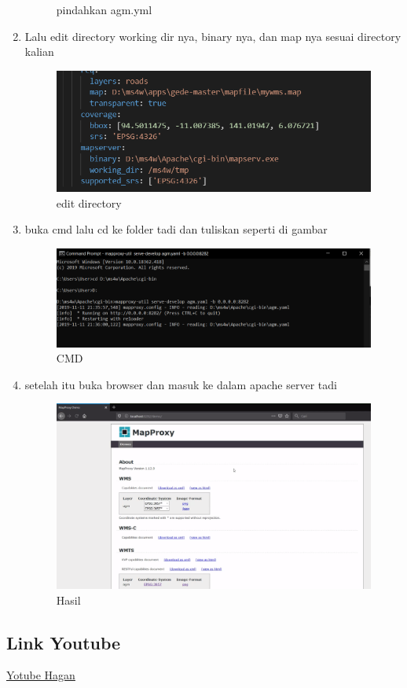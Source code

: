 \begin{enumerate}
\begin{figure}[H]
		\centering
		\caption{pindahkan agm.yml}
	\end{figure}
    \item Lalu edit directory working dir nya, binary nya, dan map nya sesuai directory kalian
    \hfill\break
    \begin{figure}[H]
		\includegraphics[width=12cm]{figures/1174040/Python3/9.PNG}
		\centering
		\caption{edit directory}
	\end{figure}
    \item buka cmd lalu cd ke folder tadi dan tuliskan seperti di gambar
    \hfill\break
    \begin{figure}[H]
		\includegraphics[width=12cm]{figures/1174040/Python3/10.PNG}
		\centering
		\caption{CMD}
	\end{figure}
    \item setelah itu buka browser dan masuk ke dalam apache server tadi
    \hfill\break
    \begin{figure}[H]
		\includegraphics[width=12cm]{figures/1174040/Python3/browser.PNG}
		\centering
		\caption{Hasil}
	\end{figure}
\end{enumerate}    
\subsection{Link Youtube}
\href{https://www.youtube.com/watch?v=8aFRr9DbjQ8}{Yotube Hagan}